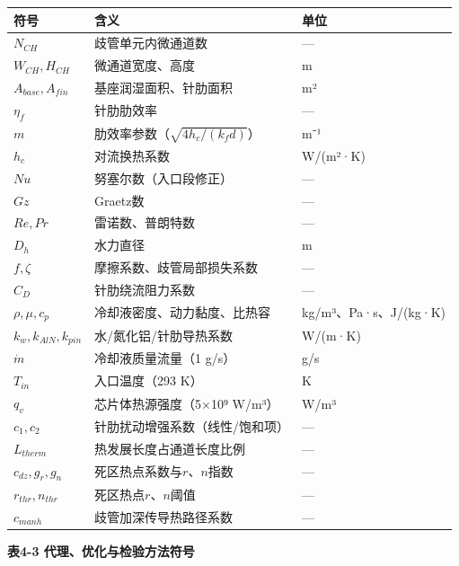 \documentclass[withoutpreface]{cumcmthesis}
\begin{document}
\begin{table}[htbp]
\centering
\small
\begin{tabularx}{\textwidth}{XXX}
\toprule
符号 & 含义 & 单位 \\
\midrule
$N_{CH}$ & 歧管单元内微通道数 & — \\
$W_{CH},H_{CH}$ & 微通道宽度、高度 & m \\
$A_{base},A_{fin}$ & 基座润湿面积、针肋面积 & m² \\
$\eta_f$ & 针肋肋效率 & — \\
$m$ & 肋效率参数（$\sqrt{4h_c/(k_f d)}$） & m⁻¹ \\
$h_c$ & 对流换热系数 & W/(m²·K) \\
$Nu$ & 努塞尔数（入口段修正） & — \\
$Gz$ & Graetz数 & — \\
$Re,Pr$ & 雷诺数、普朗特数 & — \\
$D_h$ & 水力直径 & m \\
$f,\zeta$ & 摩擦系数、歧管局部损失系数 & — \\
$C_D$ & 针肋绕流阻力系数 & — \\
$\rho,\mu,c_p$ & 冷却液密度、动力黏度、比热容 & kg/m³、Pa·s、J/(kg·K) \\
$k_w,k_{AlN},k_{pin}$ & 水/氮化铝/针肋导热系数 & W/(m·K) \\
$\dot m$ & 冷却液质量流量（1 g/s） & g/s \\
$T_{in}$ & 入口温度（293 K） & K \\
$q_v$ & 芯片体热源强度（5×10⁹ W/m³） & W/m³ \\
$c_1,c_2$ & 针肋扰动增强系数（线性/饱和项） & — \\
$L_{therm}$ & 热发展长度占通道长度比例 & — \\
$c_{dz},g_r,g_n$ & 死区热点系数与$r$、$n$指数 & — \\
$r_{thr},n_{thr}$ & 死区热点$r$、$n$阈值 & — \\
$c_{manh}$ & 歧管加深传导热路径系数 & — \\
\bottomrule
\end{tabularx}
\end{table}
\textbf{表4-3 代理、优化与检验方法符号}
\end{document}

